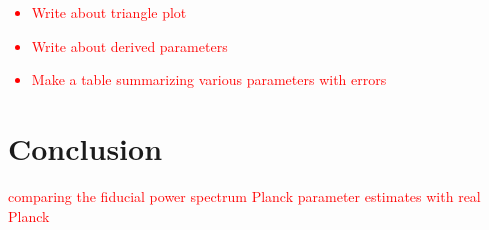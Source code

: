 \documentclass{emulateapj}
\newcommand\writingnote[1]{\textcolor{red}{#1}}
\begin{document}
\writingnote{
    \begin{itemize}
        \item Write about triangle plot
        \item Write about derived parameters
        \item Make a table summarizing various parameters with errors
    \end{itemize}
}

\section{Conclusion}

\appendix

\writingnote{comparing the fiducial power spectrum Planck parameter estimates with real Planck}


\end{document}
